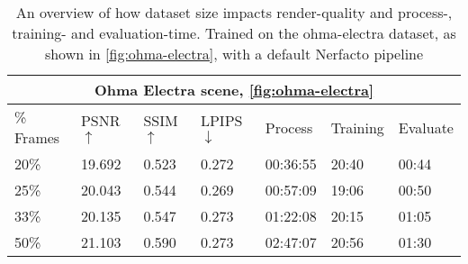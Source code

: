 \begin{comment}
\begin{table}[h]
\centering
\begin{tabular}{ccccccc}
\hline
\# Samples & PSNR $\uparrow$ & SSIM $\uparrow$ & LPIPS $\downarrow$ & Process Time & Training Time & Evaluate Time \\ \hline
5\%                       & 17.955    & 0.458     & 0.338    & 02:37    & 29:03    & 00:19    \\
10\%                      & 19.422    & 0.505     & 0.280    & 06:10    & 28:31    & 00:24    \\
15\%                      & 19.841    & 0.537     & 0.268    & 12:50    & 28:39    & 00:32    \\
20\%                      & 20.341    & 0.555     & 0.269    & 18:17    & 28:24    & 00:35    \\
25\%                      & 20.118    & 0.548     & 0.263    & 30:05    & 49:08    & 01:15    \\
40\%                      & 22.371    & 0.649     & 0.258    & 58:01    & 28:50    & 01:13    \\
50\%                      & 21.738    & 0.623     & 0.263    & -    & -    & -    \\
75\%                      & -    & -     & -    & -    & -    & -    \\
\multicolumn{1}{l}{100\%} & -    & -     & -    & -    & -    & -    \\ \hline
\end{tabular}
\caption{An overview of how dataset size impacts render-quality and process-, training- and evaluation-time. Trained on \autoref{fig:ohma-electra} with a vanilla Nerfacto pipeline}
\label{tab:colmap-dataset-size}
\end{table}
\end{comment}

\begin{table}[h]
\centering
\begin{tabular}{|l|llllll|}
\hline
\multicolumn{7}{|c|}{\textbf{Ohma Electra scene, \autoref{fig:ohma-electra}}} \\
\hline
\% Frames & PSNR $\uparrow$ & SSIM $\uparrow$ & LPIPS $\downarrow$ & Process & Training & Evaluate \\ \hline
20\%        & 19.692    & 0.523     & 0.272    & 00:36:55    & 20:40    & 00:44    \\
25\%        & 20.043    & 0.544     & 0.269    & 00:57:09    & 19:06    & 00:50    \\
33\%        & 20.135    & 0.547     & 0.273    & 01:22:08    & 20:15    & 01:05    \\
50\%        & 21.103    & 0.590     & 0.273    & 02:47:07    & 20:56    & 01:30    \\
\hline
\end{tabular}
\caption{An overview of how dataset size impacts render-quality and process-, training- and evaluation-time. Trained on the ohma-electra dataset, as shown in \autoref{fig:ohma-electra}, with a default Nerfacto pipeline}
\label{tab:colmap-dataset-size}
\end{table}